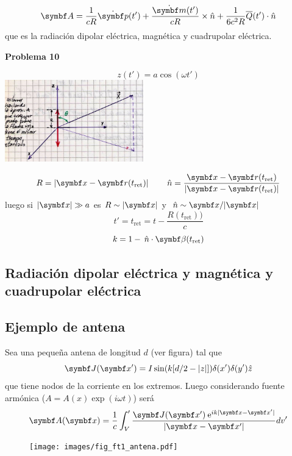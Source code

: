 \documentclass[10pt,oneside]{CBFT_book}
\begin{document}
\[
	\vb{A} = \frac{1}{cR} \dot{\vb{p}}(t') + \frac{\dot{\vb{m}}(t')}{cR} \times \hat{n} + 
	\frac{1}{6c^2R} {\overline{Q}}(t') \cdot \hat{n}
\]
que es la radiación dipolar eléctrica,  magnética y cuadrupolar eléctrica.

\begin{ejemplo}{\bf Problema 10}

\[
	z(t') = a \cos( \omega t' )
\]
\includegraphics[width=0.45\textwidth]{images/fig_ft1_antena_probl.jpg}

\[
	R = | \vbx - \vb{r}(t_\text{ret}) | \qquad 
	\nver = \frac{ \vbx - \vb{r}(t_\text{ret}) }{| \vbx - \vb{r}(t_\text{ret}) |}
\]
luego si $|\vbx|\gg a$ es $ R \sim |\vbx| $ y $ \nver \sim \vbx/|\vbx|$
\[
	t'= t_\text{ret} = t - \frac{R(t_\text{ret}))}{c}
\]
\[
	k = 1 - \nver\cdot\vb{\b}(t_\text{ret})
\]
\end{ejemplo}

\subsection{Radiación dipolar eléctrica y magnética y cuadrupolar eléctrica}



\subsection{Ejemplo de antena}

Sea una pequeña antena de longitud $d$ (ver figura) tal que 
\[
	\vb{J}(\vb{x}') = I \sin( k[d/2 - |z|] ) \delta(x') \delta(y')  \hat{z}
\]
que tiene nodos de la corriente en los extremos. Luego considerando fuente armónica ($A=A(x)\exp(i\omega t)$)
será
\[
	\vb{A}(\vb{x}) = \frac{1}{c} \int_V' \frac{ \vb{J}(\vb{x}') \euler^{ i k |\vb{x}-\vb{x}'| }}
	{ |\vb{x}-\vb{x}'| } dv'
\]

\begin{figure}[htb]
	\begin{center}
	\texttt{[image: images/fig\_ft1\_antena.pdf]}	 
	\end{center}
	\caption{}
\end{figure} 
\end{document}
